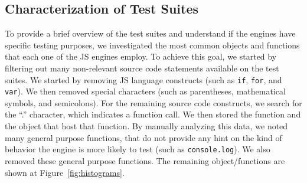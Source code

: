 \documentclass[smallextended]{svjour3}
\begin{document}






\subsection{Characterization of Test Suites}

To provide a brief overview of the test suites and understand if the engines
have specific testing purposes, we investigated the most common
objects and functions that each one of the JS engines employ.
To achieve this goal, we started by filtering out many non-relevant source
code statements available on the test suites. We started by removing JS language constructs (such as \texttt{if}, \texttt{for}, and \texttt{var}). We then removed
special characters (such as parentheses, mathematical symbols, and semicolons).
For the remaining source code constructs, we search for the ``.'' character, which
indicates a function call. We then stored the function and the object that host
that function.  By manually analyzing this data, we noted many general purpose
functions, that do not provide any hint on the kind of behavior the engine is
more likely to test (such as \texttt{console.log}). We also removed these
general purpose functions. The remaining object/functions are shown at
Figure~\ref{fig:histograms}.
\end{document}

